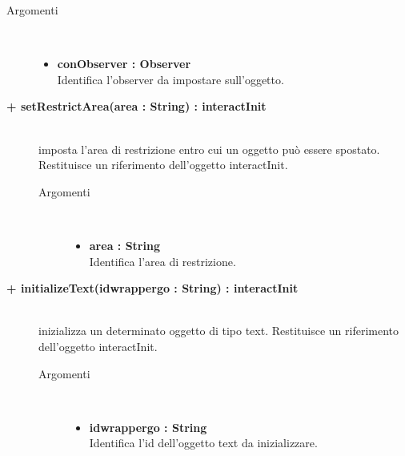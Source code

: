\begin{description}
\begin{description}
		\begin{description}
			\item[Argomenti] \hfill \\
				\begin{itemize}
				
					\item \textbf{conObserver : Observer			} \hfill \\
						Identifica l'observer da impostare sull'oggetto.
					
				\end{itemize}
		\end{description}
	\end{description}			

	\begin{description}
		\item[\textbf{\color{blue}+ setRestrictArea(area : String) : interactInit			}] \hfill \\
			imposta l'area di restrizione entro cui un oggetto può essere spostato. Restituisce un riferimento dell'oggetto interactInit.
			
		\begin{description}
			\item[Argomenti] \hfill \\
				\begin{itemize}
				
					\item \textbf{area : String			} \hfill \\
						Identifica l'area di restrizione.
					
				\end{itemize}
		\end{description}
	\end{description}
	
		\begin{description}
		\item[\textbf{\color{blue}+ initializeText(idwrappergo : String) : interactInit			}] \hfill \\
			inizializza un determinato oggetto di tipo text. Restituisce un riferimento dell'oggetto interactInit.
			
		\begin{description}
			\item[Argomenti] \hfill \\
				\begin{itemize}
				
					\item \textbf{idwrappergo : String			} \hfill \\
						Identifica l'id dell'oggetto text da inizializzare.
					

\end{itemize}
\end{description}
\end{description}
\end{description}
